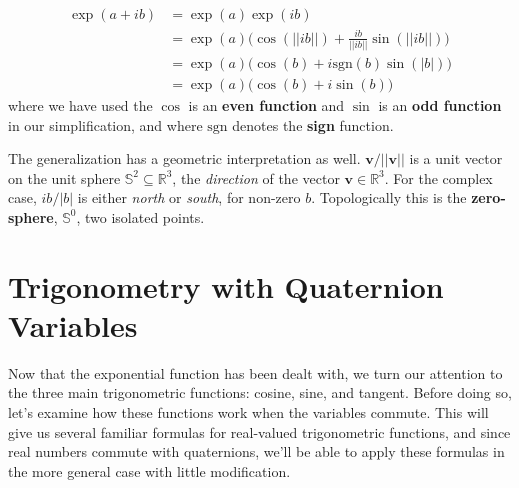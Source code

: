 \documentclass{article}
\begin{document}
            \begin{subequations}
                \label{eqn:exp_quaternion_purely_complex}
                \begin{align}
                    \exp(a+ib)
                    &=\exp(a)\exp(ib)\\
                    &=\exp(a)\Big(
                        \cos(||ib||)+\frac{ib}{||ib||}\sin(||ib||)
                    \Big)\\
                    &=\exp(a)\Big(\cos(b)+i\textrm{sgn}(b)\sin(|b|)\Big)\\
                    &=\exp(a)\Big(\cos(b)+i\sin(b)\Big)
                \end{align}
            \end{subequations}
            where we have used the $\cos$ is an \textbf{even function} and
            $\sin$ is an \textbf{odd function} in our simplification, and
            where $\textrm{sgn}$ denotes the \textbf{sign} function.
            \par\hfill\par
            The generalization has a geometric interpretation as well.
            $\mathbf{v}/||\mathbf{v}||$ is a unit vector on the unit sphere
            $\mathbb{S}^{2}\subseteq\mathbb{R}^{3}$, the \textit{direction} of
            the vector $\mathbf{v}\in\mathbb{R}^{3}$. For the complex case,
            $ib/|b|$ is either \textit{north} or \textit{south}, for non-zero
            $b$. Topologically this is the \textbf{zero-sphere},
            $\mathbb{S}^{0}$, two isolated points.
    \section{Trigonometry with Quaternion Variables}
        Now that the exponential function has been dealt with, we turn our
        attention to the three main trigonometric functions: cosine, sine, and
        tangent. Before doing so, let's examine how these functions work when
        the variables commute. This will give us several familiar formulas for
        real-valued trigonometric functions, and since real numbers commute
        with quaternions, we'll be able to apply these formulas in the more
        general case with little modification.
\end{document}
